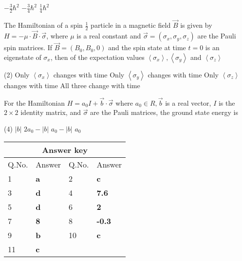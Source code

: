 \begin{enumerate}
\begin{tasks}
	\task[\textbf{A.}] $-\frac{3}{2} \hbar^{2}$
	\task[\textbf{B.}]$-\frac{3}{4} \hbar^{2}$
	\task[\textbf{D.}] $\frac{1}{4} \hbar^{2}$
\end{tasks}
\begin{minipage}{\textwidth}
	\item The Hamiltonian of a spin $\frac{1}{2}$ particle in a magnetic field $\vec{B}$ is given by $H=-\mu \cdot \vec{B} \cdot \vec{\sigma}$, where $\mu$ is a real constant and $\vec{\sigma}=\left(\sigma_{x}, \sigma_{y}, \sigma_{z}\right)$ are the Pauli spin matrices. If $\vec{B}=\left(B_{0}, B_{0}, 0\right)$ and the spin state at time $t=0$ is an eigenstate of $\sigma_{x}$, then of the expectation values $\left\langle\sigma_{x}\right\rangle,\left\langle\sigma_{y}\right\rangle$ and $\left\langle\sigma_{z}\right\rangle$
\end{minipage}
\begin{tasks}(2)
	\task[\textbf{A.}] Only $\left\langle\sigma_{x}\right\rangle$ changes with time
	\task[\textbf{B.}] Only $\left\langle\sigma_{y}\right\rangle$ changes with time
	\task[\textbf{C.}]Only $\left\langle\sigma_{z}\right\rangle$ changes with time
	\task[\textbf{D.}]All three change with time
\end{tasks}
\begin{minipage}{\textwidth}
	\item For the Hamiltonian $H=a_{0} I+\vec{b} \cdot \vec{\sigma}$ where $a_{0} \in R, \vec{b}$ is a real vector, $I$ is the $2 \times 2$ identity matrix, and $\vec{\sigma}$ are the Pauli matrices, the ground state energy is
\end{minipage}
\begin{tasks}(4)
	\task[\textbf{A.}] $|b|$
	\task[\textbf{B.}]$2 a_{0}-|b|$
	\task[\textbf{C.}]$a_{0}-|b|$
	\task[\textbf{D.}]$a_{0}$
\end{tasks}
\end{enumerate}

\setlength\arrayrulewidth{1pt}
\begin{table}[H]
	\centering
	
	\begin{tabular}{|p{1.5cm}|p{1.5cm}||p{1.5cm}|p{1.5cm}|}
		\hline
		\multicolumn{4}{|c|}{\textbf{Answer key}}\\\hline\hline
		\rowcolor{ocrel}Q.No.&Answer&Q.No.&Answer\\\hline
		1&\textbf{a}&2&\textbf{c}\\\hline
		3&\textbf{d}&4&\textbf{7.6}\\\hline
		5&\textbf{d}&6&\textbf{2}\\\hline
		7&\textbf{8}&8&\textbf{-0.3}\\\hline
		9&\textbf{b}&10&\textbf{c}\\\hline
		11&\textbf{c}&&\\\hline
	\end{tabular}
\end{table}




